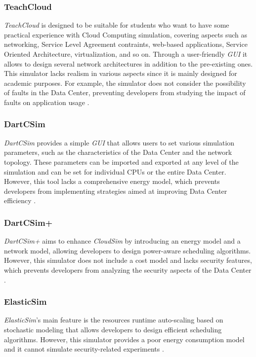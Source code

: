 {\subsubsection*{TeachCloud}
\emph{TeachCloud} \cite{jararweh2013teachcloud} is designed to be suitable for students who want to have some practical experience with Cloud Computing simulation, covering aspects such as networking, Service Level Agreement contraints, web-based applications, Service Oriented Architecture, virtualization, and so on. Through a user-friendly \emph{GUI} it allows to design several network architectures in addition to the pre-existing ones. This simulator lacks realism in various aspects since it is mainly designed for academic purposes. For example, the simulator does not consider the possibility of faults in the Data Center, preventing developers from studying the impact of faults on application usage \cite{mansouri2020cloud} \cite{patel2016comprehensive}.
\subsubsection*{DartCSim}
\emph{DartCSim} \cite{li2012dartcsim} provides a simple \emph{GUI} that allows users to set various simulation parameters, such as the characteristics of the Data Center and the network topology. These parameters can be imported and exported at any level of the simulation and can be set for individual CPUs or the entire Data Center. However, this tool lacks a comprehensive energy model, which prevents developers from implementing strategies aimed at improving Data Center efficiency \cite{mansouri2020cloud}.
\subsubsection*{DartCSim+}
\emph{DartCSim+} \cite{li2013dartcsim+} aims to enhance \emph{CloudSim} by introducing an energy model and a network model, allowing developers to design power-aware scheduling algorithms. However, this simulator does not include a cost model and lacks security features, which prevents developers from analyzing the security aspects of the Data Center \cite{mansouri2020cloud}.
\subsubsection*{ElasticSim}
\emph{ElasticSim}'s \cite{cai2017elasticsim} main feature is the resources runtime auto-scaling based on stochastic modeling that allows developers to design efficient scheduling algorithms. However, this simulator provides a poor energy consumption model and it cannot simulate security-related experiments \cite{mansouri2020cloud}.
}
